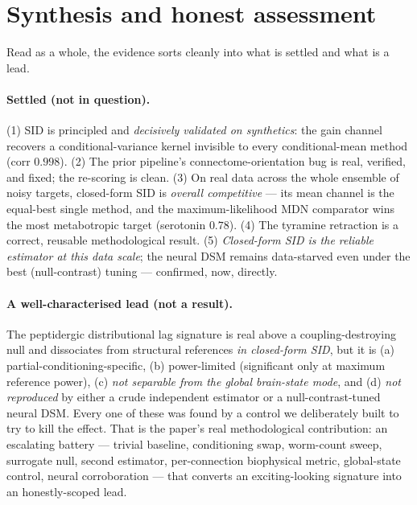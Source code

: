 \documentclass[11pt]{article}
\begin{document}
\section{Synthesis and honest assessment}
\label{sec:synthesis}

Read as a whole, the evidence sorts cleanly into what is settled and what is a lead.

\paragraph{Settled (not in question).}
(1) SID is principled and \emph{decisively validated on synthetics}: the gain channel recovers a
conditional-variance kernel invisible to every conditional-mean method (corr $0.998$). (2) The
prior pipeline's connectome-orientation bug is real, verified, and fixed; the re-scoring is clean.
(3) On real data across the whole ensemble of noisy targets, closed-form SID is \emph{overall
competitive} --- its mean channel is the equal-best single method, and the maximum-likelihood MDN comparator wins
the most metabotropic target (serotonin $0.78$). (4) The tyramine retraction is a correct,
reusable methodological result. (5) \emph{Closed-form SID is the reliable estimator at this data
scale}; the neural DSM remains data-starved even under the best (null-contrast) tuning --- confirmed,
now, directly.

\paragraph{A well-characterised lead (not a result).} The peptidergic distributional lag signature is
real above a coupling-destroying null and dissociates from structural references \emph{in closed-form
SID}, but it is (a) partial-conditioning-specific, (b) power-limited (significant only at maximum
reference power), (c) \emph{not separable from the global brain-state mode}, and (d) \emph{not
reproduced} by either a crude independent estimator or a null-contrast-tuned neural DSM. Every one of
these was found by a control we deliberately built to try to kill the effect. That is the paper's real
methodological contribution: an escalating battery --- trivial baseline, conditioning swap, worm-count
sweep, surrogate null, second estimator, per-connection biophysical metric, global-state control,
neural corroboration --- that converts an exciting-looking signature into an honestly-scoped lead.
\end{document}
